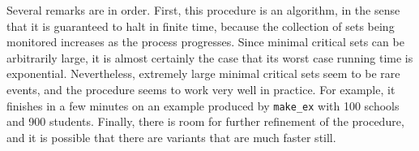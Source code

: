 \documentclass[12pt]{article}
\theoremstyle{definition}
\begin{document}
Several remarks are in order.  First, this procedure is an algorithm,
in the sense that it is guaranteed to halt in finite time, because the
collection of sets being monitored increases as the process
progresses.  Since minimal critical sets can be arbitrarily large, it
is almost certainly the case that its worst case running time is
exponential.  Nevertheless, extremely large minimal critical sets seem to be
rare events, and the procedure seems to work very well in practice.
For example, it finishes in a few minutes on an example produced by
\texttt{make\_ex} with 100 schools and 900 students.  Finally, there
is room for further refinement of the procedure, and it is possible
that there are variants that are much faster still.



\end{document}
